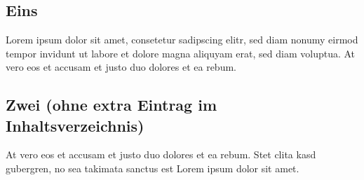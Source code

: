 \chapter{\appendixname}

\section{Eins}
Lorem ipsum dolor sit amet, consetetur sadipscing elitr, sed diam nonumy eirmod tempor invidunt ut labore et dolore magna aliquyam erat, sed diam voluptua. At vero eos et accusam et justo duo dolores et ea rebum.

\section*{Zwei (ohne extra Eintrag im Inhaltsverzeichnis)}
At vero eos et accusam et justo duo dolores et ea rebum. Stet clita kasd gubergren, no sea takimata sanctus est Lorem ipsum dolor sit amet.


